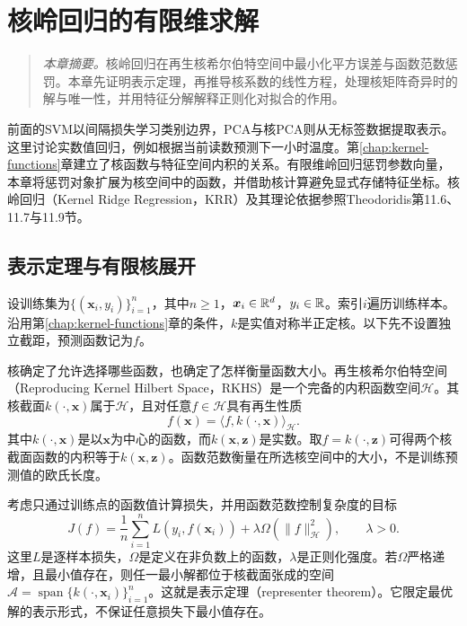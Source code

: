 \chapter{核岭回归的有限维求解}
\label{chap:krr}
\begin{quote}\small
\textit{本章摘要。}核岭回归在再生核希尔伯特空间中最小化平方误差与函数范数惩罚。本章先证明表示定理，再推导核系数的线性方程，处理核矩阵奇异时的解与唯一性，并用特征分解解释正则化对拟合的作用。
\end{quote}

前面的SVM以间隔损失学习类别边界，PCA与核PCA则从无标签数据提取表示。这里讨论实数值回归，例如根据当前读数预测下一小时温度。第\ref{chap:kernel-functions}章建立了核函数与特征空间内积的关系。有限维岭回归惩罚参数向量，本章将惩罚对象扩展为核空间中的函数，并借助核计算避免显式存储特征坐标。核岭回归（Kernel Ridge Regression，KRR）及其理论依据参照Theodoridis第11.6、11.7与11.9节\cite{theodoridis2015ml}。

\section{表示定理与有限核展开}
设训练集为$\{(\bm x_i,y_i)\}_{i=1}^n$，其中$n\ge1$，$\bm x_i\in\mathbb{R}^d$，$y_i\in\mathbb{R}$。索引$i$遍历训练样本。沿用第\ref{chap:kernel-functions}章的条件，$k$是实值对称半正定核。以下先不设置独立截距，预测函数记为$f$。

核确定了允许选择哪些函数，也确定了怎样衡量函数大小。再生核希尔伯特空间（Reproducing Kernel Hilbert Space，RKHS）是一个完备的内积函数空间$\mathcal H$。其核截面$k(\cdot,\bm x)$属于$\mathcal H$，且对任意$f\in\mathcal H$具有再生性质
\begin{equation}
 f(\bm x)=\langle f,k(\cdot,\bm x)\rangle_{\mathcal H}.
 \label{eq:krr-reproducing-property}
\end{equation}
其中$k(\cdot,\bm x)$是以$\bm x$为中心的函数，而$k(\bm x,\bm z)$是实数。取$f=k(\cdot,\bm z)$可得两个核截面函数的内积等于$k(\bm x,\bm z)$。函数范数衡量在所选核空间中的大小，不是训练预测值的欧氏长度。

考虑只通过训练点的函数值计算损失，并用函数范数控制复杂度的目标
\begin{equation}
 J(f)=\frac1n\sum_{i=1}^n L(y_i,f(\bm x_i))
 +\lambda\Omega(\|f\|_{\mathcal H}^2),\qquad\lambda>0.
 \label{eq:krr-representer-objective}
\end{equation}
这里$L$是逐样本损失，$\Omega$是定义在非负数上的函数，$\lambda$是正则化强度。若$\Omega$严格递增，且最小值存在，则任一最小解都位于核截面张成的空间$\mathcal A=\operatorname{span}\{k(\cdot,\bm x_i)\}_{i=1}^n$。这就是表示定理（representer theorem）。它限定最优解的表示形式，不保证任意损失下最小值存在。

